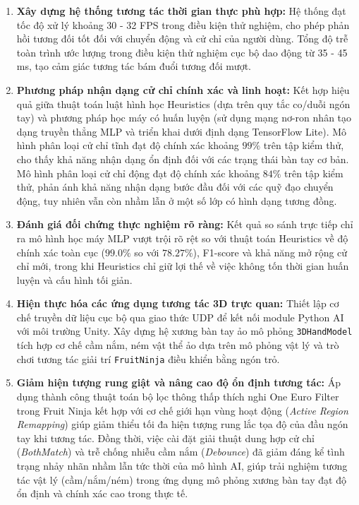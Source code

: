 \documentclass[../BTL.tex]{subfiles}
\begin{document}
\begin{enumerate}
    \item \textbf{Xây dựng hệ thống tương tác thời gian thực phù hợp:} Hệ thống đạt tốc độ xử lý khoảng 30 - 32 FPS trong điều kiện thử nghiệm, cho phép phản hồi tương đối tốt đối với chuyển động và cử chỉ của người dùng. Tổng độ trễ toàn trình ước lượng trong điều kiện thử nghiệm cục bộ dao động từ 35 - 45 ms, tạo cảm giác tương tác bám đuổi tương đối mượt.
    \item \textbf{Phương pháp nhận dạng cử chỉ chính xác và linh hoạt:} Kết hợp hiệu quả giữa thuật toán luật hình học Heuristics (dựa trên quy tắc co/duỗi ngón tay) và phương pháp học máy có huấn luyện (sử dụng mạng nơ-ron nhân tạo dạng truyền thẳng MLP và triển khai dưới định dạng TensorFlow Lite). Mô hình phân loại cử chỉ tĩnh đạt độ chính xác khoảng $99\%$ trên tập kiểm thử, cho thấy khả năng nhận dạng ổn định đối với các trạng thái bàn tay cơ bản. Mô hình phân loại cử chỉ động đạt độ chính xác khoảng $84\%$ trên tập kiểm thử, phản ánh khả năng nhận dạng bước đầu đối với các quỹ đạo chuyển động, tuy nhiên vẫn còn nhầm lẫn ở một số lớp có hình dạng tương đồng.
    \item \textbf{Đánh giá đối chứng thực nghiệm rõ ràng:} Kết quả so sánh trực tiếp chỉ ra mô hình học máy MLP vượt trội rõ rệt so với thuật toán Heuristics về độ chính xác toàn cục ($99.0\%$ so với $78.27\%$), F1-score và khả năng mở rộng cử chỉ mới, trong khi Heuristics chỉ giữ lợi thế về việc không tốn thời gian huấn luyện và cấu hình tối giản.
    \item \textbf{Hiện thực hóa các ứng dụng tương tác 3D trực quan:} Thiết lập cơ chế truyền dữ liệu cục bộ qua giao thức UDP để kết nối module Python AI với môi trường Unity. Xây dựng hệ xương bàn tay ảo mô phỏng \texttt{3DHandModel} tích hợp cơ chế cầm nắm, ném vật thể ảo dựa trên mô phỏng vật lý và trò chơi tương tác giải trí \texttt{FruitNinja} điều khiển bằng ngón trỏ.
    \item \textbf{Giảm hiện tượng rung giật và nâng cao độ ổn định tương tác:} Áp dụng thành công thuật toán bộ lọc thông thấp thích nghi One Euro Filter trong Fruit Ninja kết hợp với cơ chế giới hạn vùng hoạt động (\textit{Active Region Remapping}) giúp giảm thiểu tối đa hiện tượng rung lắc tọa độ của đầu ngón tay khi tương tác. Đồng thời, việc cài đặt giải thuật dung hợp cử chỉ (\textit{BothMatch}) và trễ chống nhiễu cầm nắm (\textit{Debounce}) đã giảm đáng kể tình trạng nhảy nhãn nhầm lẫn tức thời của mô hình AI, giúp trải nghiệm tương tác vật lý (cầm/nắm/ném) trong ứng dụng mô phỏng xương bàn tay đạt độ ổn định và chính xác cao trong thực tế.
\end{enumerate}
\end{document}
